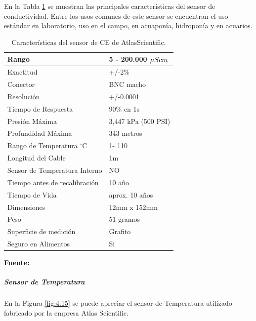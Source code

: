 En la Tabla \ref{tab:caract_ce} se muestran las principales características del sensor de conductividad.
Entre los usos comunes de este sensor se encuentran el uso estándar en laboratorio, uso en el campo, en acuaponía, hidroponía y en acuarios.
\begin{table}[H]
\protect\caption[Características del sensor de CE de AtlasScientific]{Características del sensor de CE de AtlasScientific.}
\label{tab:caract_ce}
\begin{center}
\begin{tabular}{|l|l|}
\hline
Rango    &  5 - 200.000 $\mu S\/cm$\\
\hline
Exactitud      &  +/-2\% \\
\hline
Conector &  BNC macho\\
\hline
Resolución   &  +/-0.0001\\
\hline
Tiempo de Respuesta   &  90\% en 1s\\
\hline
Presión Máxima    &  3,447 kPa (500 PSI) \\
\hline
Profundidad Máxima	& 343 metros\\
\hline
Rango de Temperatura $^{\circ}$C	& 1- 110\\
\hline
Longitud del Cable	& 1m\\
\hline
Sensor de Temperatura Interno	& NO\\
\hline
Tiempo antes de recalibración	& 10 año\\
\hline
Tiempo de Vida	& aprox. 10 años\\
\hline
Dimensiones	& 12mm x 152mm\\
\hline
Peso	& 51 gramos\\
\hline
Superficie de medición	& Grafito\\
\hline
Seguro en Alimentos	& Si\\
\hline
\end{tabular}
\vspace{5mm}
\newline
\hfill \textbf{Fuente:} \cite{atlasce}
\end{center}
\end{table}

\subparagraph{Sensor de Temperatura}
En la Figura \ref{fig:4.15}  se puede apreciar el sensor de Temperatura utilizado fabricado por la empresa Atlas Scientific.


